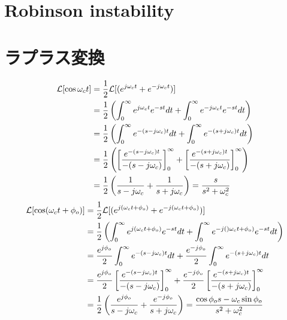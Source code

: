 \documentclass[book]{jlreq}
\begin{document}
\chapter{Robinson instability}

\appendix
\chapter{ラプラス変換}
%
\begin{align}
    \mathcal{L} [\cos\omega_c t]
     & = \frac{1}{2}\mathcal{L}[(e^{j\omega_c t}+e^{-j\omega_c t})]\notag                                                    \\
     & = \frac{1}{2}\left(\int_0^\infty e^{j\omega_c t} e^{-st} dt + \int_0^\infty e^{-j\omega_c t} e^{-st} dt \right)\notag \\
     & = \frac{1}{2}\left(\int_0^\infty e^{-(s-j\omega_c) t} dt + \int_0^\infty e^{-(s+j\omega_c) t} dt \right)\notag        \\
     & = \frac{1}{2}\left(\left[\frac{e^{-(s-j\omega_c) t}}{-(s-j\omega_c)}\right]_0^\infty +
    \left[\frac{e^{-(s+j\omega_c) t}}{-(s+j\omega_c)}\right]_0^\infty \right)\notag                                          \\
     & = \frac{1}{2}\left( \frac{1}{s-j\omega_c}+\frac{1}{s+j\omega_c}\right)
    = \frac{s}{s^2+\omega_c^2}
    \label{eq:lt_cos}
\end{align}
%
\begin{align}
    \mathcal{L} [\cos(\omega_c t + \phi_o)]
     & = \frac{1}{2}\mathcal{L}[(e^{j(\omega_c t+\phi_o)}+e^{-j(\omega_c t+\phi_o)})]\notag                                             \\
     & = \frac{1}{2}\left(\int_0^\infty e^{j(\omega_c t+\phi_o)} e^{-st} dt
    + \int_0^\infty e^{-j()\omega_c t+\phi_o)} e^{-st} dt \right)\notag                                                                 \\
     & = \frac{e^{j\phi_o}}{2}\int_0^\infty e^{-(s-j\omega_c) t} dt + \frac{e^{-j\phi_o}}{2}\int_0^\infty e^{-(s+j\omega_c) t} dt\notag \\
     & = \frac{e^{j\phi_o}}{2}\left[\frac{e^{-(s-j\omega_c) t}}{-(s-j\omega_c)}\right]_0^\infty
    +\frac{e^{-j\phi_o}}{2}\left[\frac{e^{-(s+j\omega_c) t}}{-(s+j\omega_c)}\right]_0^\infty\notag                                      \\
     & = \frac{1}{2}\left( \frac{e^{j\phi_o}}{s-j\omega_c}+\frac{e^{-j\phi_o}}{s+j\omega_c}\right)
    = \frac{\cos\phi_o s - \omega_c\sin\phi_o}{s^2+\omega_c^2}
    \label{eq:lt_cos_phi0}
\end{align}
\end{document}
